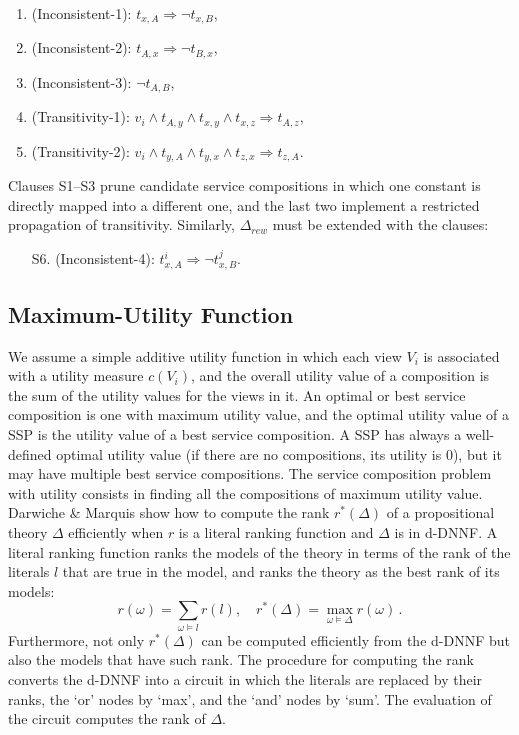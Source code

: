 \documentclass{llncs}
\newcommand{\denselist}{\topsep 0pt \itemsep -4pt}
\begin{document}
\begin{enumerate}[S1.]\denselist
\item (Inconsistent-1): $t_{x,A} \Rightarrow \neg t_{x,B}$,
\item (Inconsistent-2): $t_{A,x} \Rightarrow \neg t_{B,x}$,
\item (Inconsistent-3): $\neg t_{A,B}$,
\item (Transitivity-1): $v_i\land t_{A,y}\land t_{x,y}\land t_{x,z}\Rightarrow t_{A,z}$,
\item (Transitivity-2): $v_i\land t_{y,A}\land t_{y,x}\land t_{z,x}\Rightarrow t_{z,A}$.
\end{enumerate}
Clauses S1--S3 prune candidate service compositions in which one constant
is directly mapped into a different one, and the last two implement
a restricted propagation of transitivity.
Similarly, $\Delta_{rew}$ must be extended with the clauses:
\begin{enumerate}[S1.]\denselist
\item[S6.] (Inconsistent-4): $t^i_{x,A} \Rightarrow \neg t^j_{x,B}$.
\end{enumerate}

\subsection{Maximum-Utility Function}
We assume a simple additive utility function in which each view
$V_i$ is associated with a utility measure $c(V_i)$, and the overall utility value of
a composition is the sum of the utility values for the views in it.
An optimal or best service composition is one with maximum utility value,
and the optimal utility value of a SSP is the utility value of a best
service composition. A SSP has always a well-defined optimal
utility value (if there are no compositions, its utility is $0$),
but it may have multiple best service compositions.
The service composition problem with utility consists in finding
all the compositions of maximum utility value.
Darwiche \& Marquis \cite{darwiche:weighted} show how to compute the
rank $r^*(\Delta)$ of a propositional theory $\Delta$
efficiently when $r$ is a literal ranking function and
$\Delta$ is in d-DNNF. A literal ranking function ranks
the models of the theory in terms of the rank of the
literals $l$ that are true in the model, and ranks the
theory as the best rank of its models:
\[ r(\omega) = \sum_{\omega\vDash l} r(l),\quad r^*(\Delta) = \max_{\omega\vDash\Delta} r(\omega)\,. \]
Furthermore, not only $r^*(\Delta)$ can be computed
efficiently from the d-DNNF but also the models that
have such rank.
The procedure for computing the rank converts the d-DNNF
into a circuit in which the literals are replaced by their
ranks, the `or' nodes by `max', and the `and' nodes by `sum'.
The evaluation of the circuit computes the rank of $\Delta$.
\end{document}
